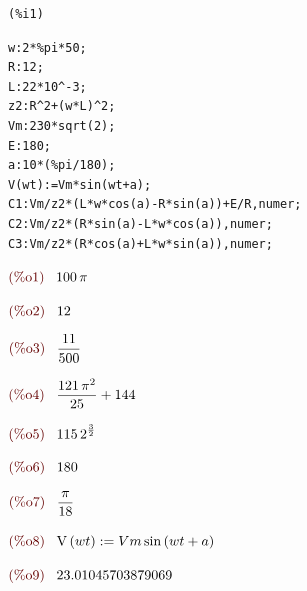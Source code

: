 \documentclass{article}
\begin{document}
\noindent
\begin{minipage}[t]{8ex}{\color{red}\bf
\begin{verbatim}
(%i1) 
\end{verbatim}}
\end{minipage}
\begin{minipage}[t]{\textwidth}{\color{blue}
\begin{verbatim}
w:2*%pi*50;
R:12;
L:22*10^-3;
z2:R^2+(w*L)^2;
Vm:230*sqrt(2);
E:180;
a:10*(%pi/180);
V(wt):=Vm*sin(wt+a);
C1:Vm/z2*(L*w*cos(a)-R*sin(a))+E/R,numer;
C2:Vm/z2*(R*sin(a)-L*w*cos(a)),numer;
C3:Vm/z2*(R*cos(a)+L*w*sin(a)),numer;
\end{verbatim}}
\end{minipage}
\begin{math}\displaystyle
\parbox{8ex}{\color{labelcolor}(\%o1) }
100\,\pi 
\end{math}

\begin{math}\displaystyle
\parbox{8ex}{\color{labelcolor}(\%o2) }
12
\end{math}

\begin{math}\displaystyle
\parbox{8ex}{\color{labelcolor}(\%o3) }
\frac{11}{500}
\end{math}

\begin{math}\displaystyle
\parbox{8ex}{\color{labelcolor}(\%o4) }
\frac{121\,{\pi }^{2}}{25}+144
\end{math}

\begin{math}\displaystyle
\parbox{8ex}{\color{labelcolor}(\%o5) }
115\,{2}^{\frac{3}{2}}
\end{math}

\begin{math}\displaystyle
\parbox{8ex}{\color{labelcolor}(\%o6) }
180
\end{math}

\begin{math}\displaystyle
\parbox{8ex}{\color{labelcolor}(\%o7) }
\frac{\pi }{18}
\end{math}

\begin{math}\displaystyle
\parbox{8ex}{\color{labelcolor}(\%o8) }
\mathrm{V}\left( wt\right) :=Vm\,\mathrm{sin}\left( wt+a\right) 
\end{math}

\begin{math}\displaystyle
\parbox{8ex}{\color{labelcolor}(\%o9) }
23.01045703879069
\end{math}
\end{document}
